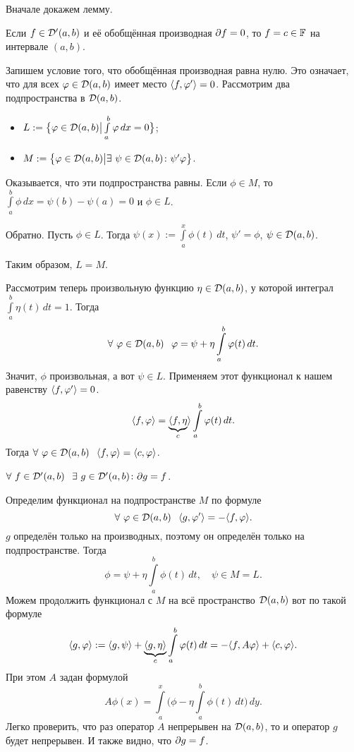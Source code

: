 Вначале докажем лемму.
\begin{Lem}
 Если $f\in\mathcal D'(a,b)$ и её обобщённая производная $\partial f = 0$, то $f=c\in\mathbb F$ на интервале $(a,b)$.
\end{Lem}
\begin{Proof}
  Запишем условие того, что обобщённая производная равна нулю. Это означает, что для всех $\varphi\in \mathcal D(a,b)$ имеет место $\langle f,\varphi'\rangle=0$. Рассмотрим два подпространства в $\mathcal D(a,b)$.
\begin{itemize}
\item $L:=\big\{\varphi\in\mathcal D(a,b)\big|\int\limits_{a}^b\varphi\,dx=0\big\}$;
\item $M:=\big\{\phi\in\D(a,b)\big|\exists\ \psi\in\D(a,b)\colon \psi'\phi\big\}$.
\end{itemize}
Оказывается, что эти подпространства равны. Если $\phi\in M$, то $\int\limits_a^b\phi\,dx = \psi(b)-\psi(a) = 0$ и $\phi\in L$.

Обратно. Пусть $\phi\in L$. Тогда $\psi(x):=\int\limits_a^x\phi(t)\,dt$, $\psi'=\phi$, $\psi\in\mathcal D(a,b)$.

Таким образом, $L=M$.

Рассмотрим теперь произвольную функцию $\eta\in\mathcal D(a,b)$, у которой интеграл $\int\limits_a^b \eta(t)\,dt = 1$. Тогда
\[
  \forall\ \varphi\in\mathcal D(a,b)\hskip .75em plus.1em minus.08em\relax \varphi = \psi +\eta\int\limits_a^b\varphi(t)\,dt.
\]
Значит, $\phi$ произвольная, а вот $\psi\in L$. Применяем этот функционал к нашем равенству $\langle f,\varphi'\rangle=0$.
\[
  \langle f,\varphi\rangle = \underbrace{\langle f,\eta}_{c}\rangle\int\limits_a^b\varphi(t)\,dt.
\]
Тогда $\forall\ \phi\in\D(a, b)\pau \la f,\phi\ra = \la c,\phi\ra$.
\end{Proof}

\begin{The}
  $\forall\ f\in\D'(a,b)\pau\exists\ g\in \D'(a,b)\colon \dl g=f$.
\end{The}
\begin{Proof}
  Определим функционал на подпространстве $M$ по формуле
\[
  \forall\ \varphi\in \mathcal D(a,b)\hskip .75em plus.1em minus.08em\relax \langle g,\varphi'\rangle = -\langle f,\varphi\rangle.
\]
$g$ определён только на производных, поэтому он определён только на подпространстве. Тогда
\[
  \phi = \psi +\eta\int\limits_a^b\phi(t)\,dt,\quad \psi\in M=L.
\]
Можем продолжить функционал с $M$ на всё пространство $\mathcal D(a,b)$ вот по такой формуле
\[
  \langle g,\varphi\rangle := \langle g,\psi\rangle + \underbrace{\langle g,\eta\rangle}_{c}\int\limits_a^b\varphi(t)\,dt = -\langle f,A\varphi\rangle + \langle c,\varphi\rangle.
\]
При этом $A$ задан формулой
\[
  A\phi(x) = \int\limits_a^x\bigg(\phi-\eta\int\limits_a^b\phi(t)\,dt\bigg)\,dy.
\]
Легко проверить, что раз оператор $A$ непрерывен на $\mathcal D(a,b)$, то и оператор $g$ будет непрерывен. И также видно, что $\partial g=f$.
\end{Proof}
